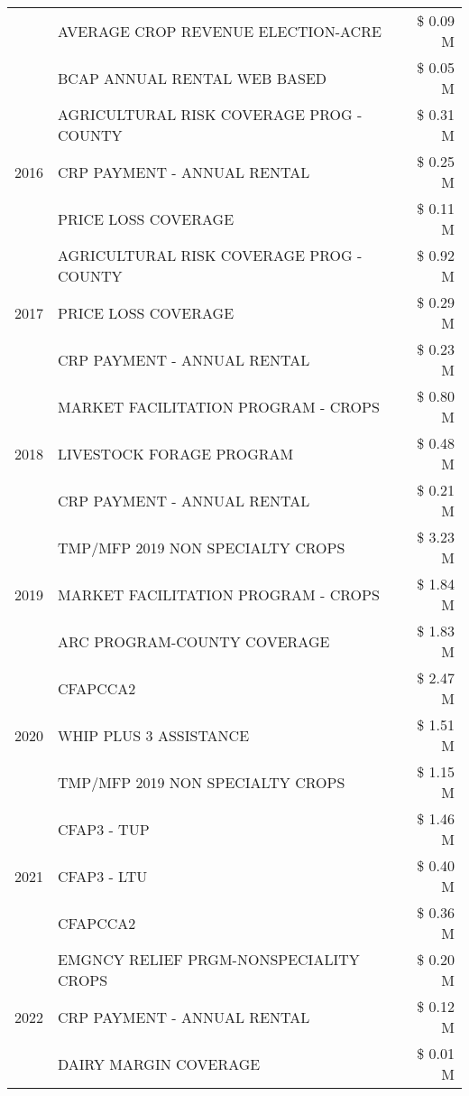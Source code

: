 \begin{tabular}{llr}
 & AVERAGE CROP REVENUE ELECTION-ACRE & \$ 0.09 M \\
 & BCAP ANNUAL RENTAL WEB BASED & \$ 0.05 M \\
\cline{1-3}
\multirow[t]{3}{*}{2016} & AGRICULTURAL RISK COVERAGE PROG - COUNTY & \$ 0.31 M \\
 & CRP PAYMENT - ANNUAL RENTAL & \$ 0.25 M \\
 & PRICE LOSS COVERAGE & \$ 0.11 M \\
\cline{1-3}
\multirow[t]{3}{*}{2017} & AGRICULTURAL RISK COVERAGE PROG - COUNTY & \$ 0.92 M \\
 & PRICE LOSS COVERAGE & \$ 0.29 M \\
 & CRP PAYMENT - ANNUAL RENTAL & \$ 0.23 M \\
\cline{1-3}
\multirow[t]{3}{*}{2018} & MARKET FACILITATION PROGRAM - CROPS & \$ 0.80 M \\
 & LIVESTOCK FORAGE PROGRAM & \$ 0.48 M \\
 & CRP PAYMENT - ANNUAL RENTAL & \$ 0.21 M \\
\cline{1-3}
\multirow[t]{3}{*}{2019} & TMP/MFP 2019 NON SPECIALTY CROPS & \$ 3.23 M \\
 & MARKET FACILITATION PROGRAM - CROPS & \$ 1.84 M \\
 & ARC PROGRAM-COUNTY COVERAGE & \$ 1.83 M \\
\cline{1-3}
\multirow[t]{3}{*}{2020} & CFAPCCA2 & \$ 2.47 M \\
 & WHIP PLUS 3 ASSISTANCE & \$ 1.51 M \\
 & TMP/MFP 2019 NON SPECIALTY CROPS & \$ 1.15 M \\
\cline{1-3}
\multirow[t]{3}{*}{2021} & CFAP3 - TUP & \$ 1.46 M \\
 & CFAP3 - LTU & \$ 0.40 M \\
 & CFAPCCA2 & \$ 0.36 M \\
\cline{1-3}
\multirow[t]{3}{*}{2022} & EMGNCY RELIEF PRGM-NONSPECIALITY CROPS & \$ 0.20 M \\
 & CRP PAYMENT - ANNUAL RENTAL & \$ 0.12 M \\
 & DAIRY MARGIN COVERAGE & \$ 0.01 M \\
\cline{1-3}
\bottomrule
\end{tabular}
